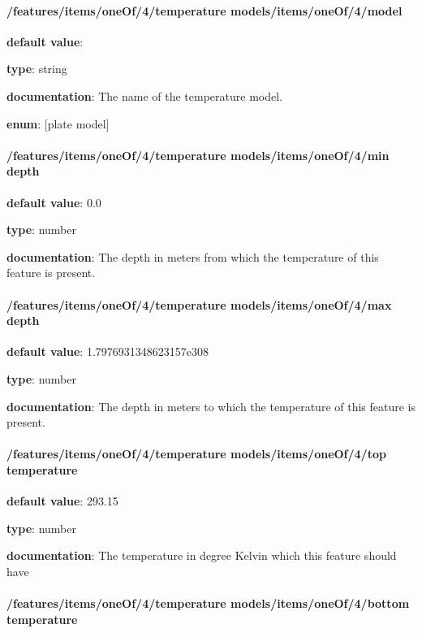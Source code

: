 \paragraph{/features/items/oneOf/4/temperature models/items/oneOf/4/model} \begin{itemized}
\item {\bf default value}: 
\item {\bf type}: string
\item {\bf documentation}: The name of the temperature model.
\item {\bf enum}: [plate model]\end{itemized}\paragraph{/features/items/oneOf/4/temperature models/items/oneOf/4/min depth} \begin{itemized}
\item {\bf default value}: 0.0
\item {\bf type}: number
\item {\bf documentation}: The depth in meters from which the temperature of this feature is present.
\end{itemized}\paragraph{/features/items/oneOf/4/temperature models/items/oneOf/4/max depth} \begin{itemized}
\item {\bf default value}: 1.7976931348623157e308
\item {\bf type}: number
\item {\bf documentation}: The depth in meters to which the temperature of this feature is present.
\end{itemized}\paragraph{/features/items/oneOf/4/temperature models/items/oneOf/4/top temperature} \begin{itemized}
\item {\bf default value}: 293.15
\item {\bf type}: number
\item {\bf documentation}: The temperature in degree Kelvin which this feature should have
\end{itemized}\paragraph{/features/items/oneOf/4/temperature models/items/oneOf/4/bottom temperature} \begin{itemized}

\end{itemized}
